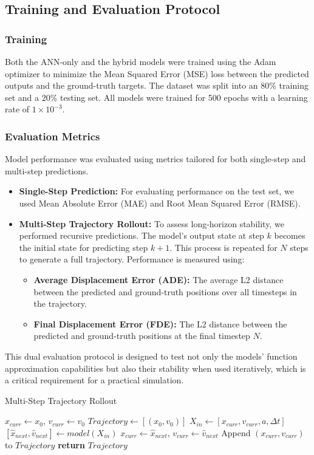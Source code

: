 \documentclass[conference]{IEEEtran}
\begin{document}
\subsection{Training and Evaluation Protocol}
\subsubsection{Training}
Both the ANN-only and the hybrid models were trained using the Adam optimizer to minimize the Mean Squared Error (MSE) loss between the predicted outputs and the ground-truth targets. The dataset was split into an 80\% training set and a 20\% testing set. All models were trained for 500 epochs with a learning rate of $1 \times 10^{-3}$.

\subsubsection{Evaluation Metrics}
Model performance was evaluated using metrics tailored for both single-step and multi-step predictions.
\begin{itemize}
    \item \textbf{Single-Step Prediction:} For evaluating performance on the test set, we used Mean Absolute Error (MAE) and Root Mean Squared Error (RMSE).
    \item \textbf{Multi-Step Trajectory Rollout:} To assess long-horizon stability, we performed recursive predictions. The model's output state at step $k$ becomes the initial state for predicting step $k+1$. This process is repeated for $N$ steps to generate a full trajectory. Performance is measured using:
        \begin{itemize}
            \item \textbf{Average Displacement Error (ADE):} The average L2 distance between the predicted and ground-truth positions over all timesteps in the trajectory.
            \item \textbf{Final Displacement Error (FDE):} The L2 distance between the predicted and ground-truth positions at the final timestep $N$.
        \end{itemize}
\end{itemize}
This dual evaluation protocol is designed to test not only the models' function approximation capabilities but also their stability when used iteratively, which is a critical requirement for a practical simulation.

\begin{algorithm}
\caption{Multi-Step Trajectory Rollout}\label{alg:rollout}
\begin{algorithmic}[1]
    \State $x_{curr} \gets x_0$, $v_{curr} \gets v_0$
    \State $Trajectory \gets [(x_0, v_0)]$
        \State $X_{in} \gets [x_{curr}, v_{curr}, a, \Delta t]$
        \State $[\hat{x}_{next}, \hat{v}_{next}] \gets model(X_{in})$
        \State $x_{curr} \gets \hat{x}_{next}$, $v_{curr} \gets \hat{v}_{next}$
        \State Append $(x_{curr}, v_{curr})$ to $Trajectory$
    \EndFor
    \State \textbf{return} $Trajectory$
\EndProcedure
\end{algorithmic}
\end{algorithm}
\end{document}

